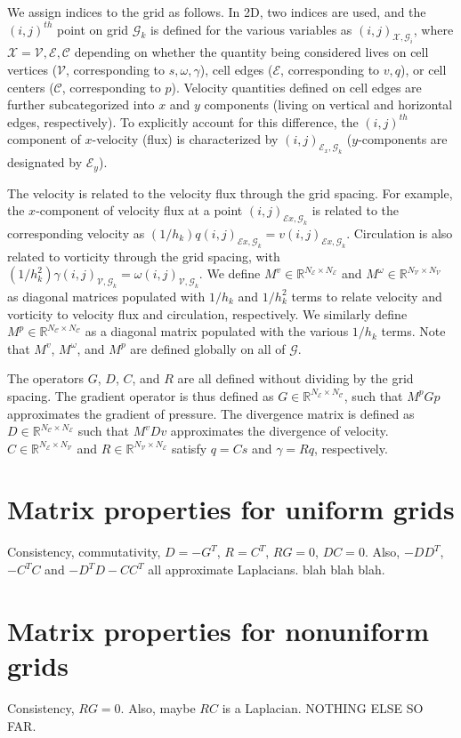 \documentclass[11pt]{article}
\begin{document}
We assign indices to the grid as follows. In 2D, two indices are used, and the $(i,j)^{th}$ point on grid $\mathcal{G}_k$ is defined for the various variables as $(i,j)_{\mathcal{X},\mathcal{G}_i}$, where $\mathcal{X} =  \mathcal{V}, \mathcal{E}, \mathcal{C}$ depending on whether the quantity being considered lives on cell vertices ($\mathcal{V}$, corresponding to $s, \omega, \gamma$), cell edges ($\mathcal{E}$, corresponding to $v, q$), or cell centers ($\mathcal{C}$, corresponding to $p$). Velocity quantities defined on cell edges are further subcategorized into $x$ and $y$ components (living on vertical and horizontal edges, respectively). To explicitly account for this difference, the $(i,j)^{th}$ component of $x$-velocity (flux) is characterized by $(i,j)_{\mathcal{E}_x, \mathcal{G}_k}$ ($y$-components are designated by $\mathcal{E}_y$).

The velocity is related to the velocity flux through the grid spacing. For example, the $x$-component of velocity flux at  a point $(i,j)_{\mathcal{E}x,\mathcal{G}_k}$ is related to the corresponding velocity as $(1/h_k )q(i,j)_{\mathcal{E}x,\mathcal{G}_k} = v(i,j)_{\mathcal{E}x,\mathcal{G}_k}$. Circulation is also related to vorticity through the grid spacing, with $(1/h_k^2)  \gamma(i,j)_{\mathcal{V},\mathcal{G}_k} = \omega(i,j)_{\mathcal{V},\mathcal{G}_k}$. We define $M^{v}\in \mathbb{R}^{N_\mathcal{E} \times N_\mathcal{E}}$ and $M^{\omega}\in \mathbb{R}^{N_\mathcal{V} \times N_\mathcal{V}}$ as diagonal matrices populated with $1/h_k$ and $1/h_k^2$ terms to relate velocity and vorticity to velocity flux and circulation, respectively. We similarly define $M^p\in \mathbb{R}^{N_\mathcal{C} \times N_\mathcal{C}}$ as a diagonal matrix populated with the various $1/h_k$ terms. Note that $M^{v}$, $M^{\omega}$, and $M^p$ are defined globally on all of $\mathcal{G}$.  

The operators $G$, $D$, $C$, and $R$ are all defined without dividing by the grid spacing. The gradient operator is thus defined as $G\in \mathbb{R}^{N_\mathcal{E} \times N_\mathcal{C}}$, such that $M^pGp$ approximates the gradient of pressure. The divergence matrix is defined as $D\in\mathbb{R}^{N_\mathcal{C} \times N_\mathcal{E}}$ such that $M^v Dv$ approximates the divergence of velocity. $C\in \mathbb{R}^{N_\mathcal{E} \times N_\mathcal{V}}$ and $R\in \mathbb{R}^{N_\mathcal{V} \times N_\mathcal{E}}$ satisfy $q = Cs$ and $\gamma = Rq$, respectively. 

\section{Matrix properties for uniform grids}

Consistency, commutativity, $D = -G^T$, $R = C^T$, $RG = 0$, $DC = 0$. Also,  $-DD^T$, $-C^TC$ and $-D^TD - CC^T$ all approximate Laplacians.  blah blah blah.


\section{Matrix properties for nonuniform grids}

Consistency, $RG = 0$. Also, maybe $RC$ is a Laplacian. NOTHING ELSE SO FAR.
\end{document}
